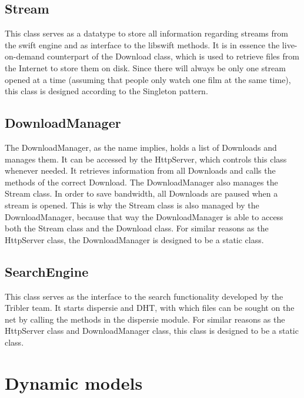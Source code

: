 \subsection{Stream}
This class serves as a datatype to store all information regarding streams from the swift engine and as interface to the libswift methods. It is in
essence the live-on-demand counterpart of the Download class, which is used to retrieve files from the Internet to store them on disk.
Since there will always be only one stream opened at a time (assuming that people only watch one film at the same time),
this class is designed according to the Singleton pattern.

\subsection{DownloadManager}
The DownloadManager, as the name implies, holds a list of Downloads and manages them. It can be accessed by the HttpServer, which controls this class whenever needed.
It retrieves information from all Downloads and calls the methods of the correct Download. The DownloadManager also manages the Stream class.
In order to save bandwidth, all Downloads are paused when a stream is opened. This is why the Stream class is also managed by the DownloadManager,
 because that way the DownloadManager is able to access both the Stream class and the Download class. For similar reasons as the HttpServer class, 
 the DownloadManager is designed to be a static class.

\subsection{SearchEngine}
This class serves as the interface to the search functionality developed by the Tribler team. It starts dispersie and DHT,
with which files can be sought on the net by calling the methods in the dispersie module. For similar reasons as the HttpServer class and DownloadManager class, 
this class is designed to be a static class.

\section{Dynamic models}


